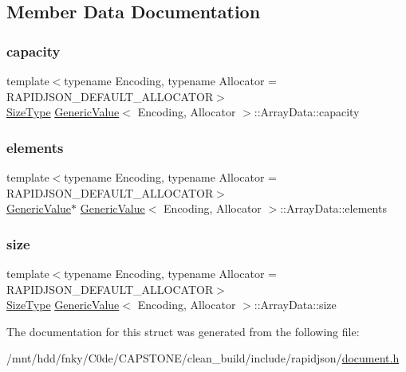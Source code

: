 \subsection{Member Data Documentation}
\mbox{\label{structGenericValue_1_1ArrayData_a0c6fe03c00e13d14b95abd31048aa1f5}} 
\subsubsection{\texorpdfstring{capacity}{capacity}}
{\footnotesize\ttfamily template$<$typename Encoding, typename Allocator = R\+A\+P\+I\+D\+J\+S\+O\+N\+\_\+\+D\+E\+F\+A\+U\+L\+T\+\_\+\+A\+L\+L\+O\+C\+A\+T\+OR$>$ \\
\hyperlink{rapidjson_8h_a5ed6e6e67250fadbd041127e6386dcb5}{Size\+Type} \hyperlink{classGenericValue}{Generic\+Value}$<$ Encoding, Allocator $>$\+::Array\+Data\+::capacity}

\mbox{\label{structGenericValue_1_1ArrayData_a86df976cb6f65924aca20eb9bd35553e}} 
\subsubsection{\texorpdfstring{elements}{elements}}
{\footnotesize\ttfamily template$<$typename Encoding, typename Allocator = R\+A\+P\+I\+D\+J\+S\+O\+N\+\_\+\+D\+E\+F\+A\+U\+L\+T\+\_\+\+A\+L\+L\+O\+C\+A\+T\+OR$>$ \\
\hyperlink{classGenericValue}{Generic\+Value}$\ast$ \hyperlink{classGenericValue}{Generic\+Value}$<$ Encoding, Allocator $>$\+::Array\+Data\+::elements}

\mbox{\label{structGenericValue_1_1ArrayData_a5306856f64aea8ec53abf263ed2a35e2}} 
\subsubsection{\texorpdfstring{size}{size}}
{\footnotesize\ttfamily template$<$typename Encoding, typename Allocator = R\+A\+P\+I\+D\+J\+S\+O\+N\+\_\+\+D\+E\+F\+A\+U\+L\+T\+\_\+\+A\+L\+L\+O\+C\+A\+T\+OR$>$ \\
\hyperlink{rapidjson_8h_a5ed6e6e67250fadbd041127e6386dcb5}{Size\+Type} \hyperlink{classGenericValue}{Generic\+Value}$<$ Encoding, Allocator $>$\+::Array\+Data\+::size}



The documentation for this struct was generated from the following file\+:\begin{DoxyCompactItemize}
\item 
/mnt/hdd/fnky/\+C0de/\+C\+A\+P\+S\+T\+O\+N\+E/clean\+\_\+build/include/rapidjson/\hyperlink{document_8h}{document.\+h}\end{DoxyCompactItemize}

